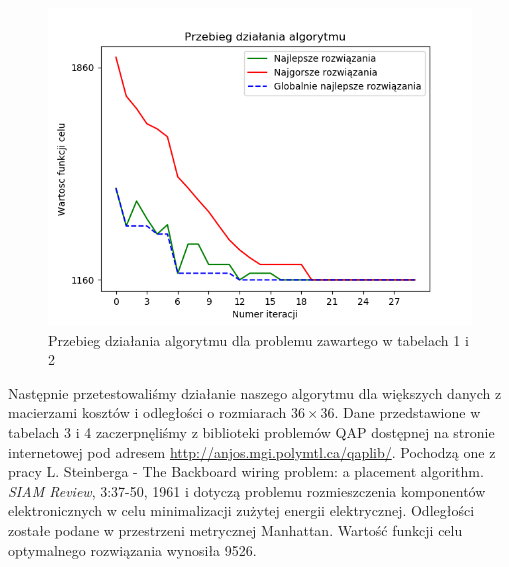 \documentclass[12pt]{article}
\begin{document}
\begin{figure}[H]
\caption{Przebieg działania algorytmu dla problemu zawartego w tabelach 1 i 2}
\includegraphics{najlepsze9x9.png}
\end{figure}
\par
Następnie przetestowaliśmy działanie naszego algorytmu dla większych danych z macierzami kosztów i odległości o rozmiarach $36 \times 36$. Dane przedstawione w tabelach 3 i 4 zaczerpnęliśmy z biblioteki problemów QAP dostępnej na stronie internetowej pod adresem \url{http://anjos.mgi.polymtl.ca/qaplib/}. Pochodzą one z pracy L. Steinberga - The Backboard wiring problem: a placement algorithm. \textit{SIAM Review}, 3:37-50, 1961 i dotyczą problemu rozmieszczenia komponentów elektronicznych w celu minimalizacji zużytej energii elektrycznej. Odległości zostałe podane w przestrzeni metrycznej Manhattan. Wartość funkcji celu optymalnego rozwiązania wynosiła 9526.
\end{document}
